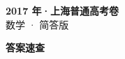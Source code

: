 \documentclass[zihao=-4, a4paper]{ctexart}
\begin{document}
\begin{center}
  {\Large\bfseries 2017 年·上海普通高考卷}\\[4pt]
  {\large 数学 · 简答版}
\end{center}
\medskip
{}

\clearpage
{}
\begin{center}{\Large\bfseries 答案速查}\end{center}
\medskip

\end{document}

